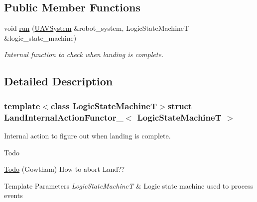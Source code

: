 \subsection*{Public Member Functions}
\begin{DoxyCompactItemize}
\item 
void \hyperlink{structLandInternalActionFunctor___a4557b02d6cfa6712b610337cb606f54b}{run} (\hyperlink{classUAVSystem}{U\-A\-V\-System} \&robot\-\_\-system, Logic\-State\-Machine\-T \&logic\-\_\-state\-\_\-machine)
\begin{DoxyCompactList}\small\item\em Internal function to check when landing is complete. \end{DoxyCompactList}\end{DoxyCompactItemize}


\subsection{Detailed Description}
\subsubsection*{template$<$class Logic\-State\-Machine\-T$>$struct Land\-Internal\-Action\-Functor\-\_\-$<$ Logic\-State\-Machine\-T $>$}

Internal action to figure out when landing is complete. 

\begin{DoxyRefDesc}{Todo}
\item[\hyperlink{todo__todo000006}{Todo}](Gowtham) How to abort Land??\end{DoxyRefDesc}



\begin{DoxyTemplParams}{Template Parameters}
{\em Logic\-State\-Machine\-T} & Logic state machine used to process events \\
\hline
\end{DoxyTemplParams}


